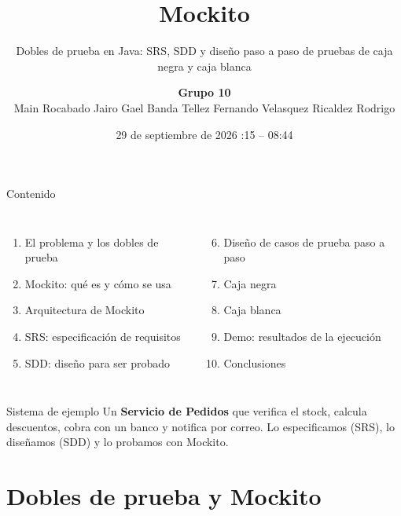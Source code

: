 \documentclass[aspectratio=169,10pt]{beamer}
\title{Mockito}
\subtitle{Dobles de prueba en Java: SRS, SDD y diseño paso a paso de pruebas de caja negra y caja blanca}
\author{\textbf{Grupo 10}\\[2pt]\small Main Rocabado Jairo Gael \quad Banda Tellez Fernando \quad Velasquez Ricaldez Rodrigo}
\institute{Universidad Mayor de San Simón -- Auditoría de Sistemas}
\date{29 de septiembre de 2026 \quad 08:15 -- 08:44}
\begin{document}
\maketitle

\begin{frame}{Contenido}
\begin{columns}[T]
\begin{enumerate}
  \item El problema y los dobles de prueba
  \item Mockito: qué es y cómo se usa
  \item Arquitectura de Mockito
  \item SRS: especificación de requisitos
  \item SDD: diseño para ser probado
\end{enumerate}
\begin{enumerate}\setcounter{enumi}{5}
  \item Diseño de casos de prueba paso a paso
  \item Caja negra
  \item Caja blanca
  \item Demo: resultados de la ejecución
  \item Conclusiones
\end{enumerate}
\end{columns}
\vspace{0.6cm}
\begin{block}{Sistema de ejemplo}
\small Un \textbf{Servicio de Pedidos} que verifica el stock, calcula descuentos, cobra con un banco y notifica por correo. Lo especificamos (SRS), lo diseñamos (SDD) y lo probamos con Mockito.
\end{block}
\end{frame}

\section{Dobles de prueba y Mockito}
\end{document}
